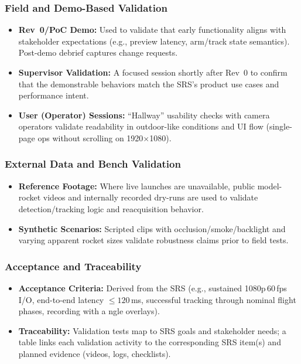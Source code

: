 \documentclass[12pt, titlepage]{article}
\begin{document}
\subsubsection*{Field and Demo-Based Validation}
\begin{itemize}
  \item \textbf{Rev~0/PoC Demo:} Used to validate that early
        functionality aligns with stakeholder expectations (e.g., preview
        latency, arm/track state semantics). Post-demo debrief captures change
        requests.
  \item \textbf{Supervisor Validation:} A focused session shortly
        after Rev~0 to confirm that the demonstrable behaviors match the
        SRS’s product use cases and performance intent.
  \item \textbf{User (Operator) Sessions:} ``Hallway'' usability
        checks with camera operators validate readability in outdoor-like
        conditions and UI flow (single-page ops without scrolling on 1920$\times$1080).
\end{itemize}

\subsubsection*{External Data and Bench Validation}
\begin{itemize}
  \item \textbf{Reference Footage:} Where live launches are unavailable,
        public model-rocket videos and internally recorded dry-runs are used
        to validate detection/tracking logic and reacquisition behavior.
  \item \textbf{Synthetic Scenarios:} Scripted clips with
        occlusion/smoke/backlight and varying apparent rocket sizes validate
        robustness claims prior to field tests.
\end{itemize}

\subsubsection*{Acceptance and Traceability}
\begin{itemize}
  \item \textbf{Acceptance Criteria:} Derived from the SRS (e.g.,
        sustained 1080p\,60\,fps I/O, end-to-end latency $\leq 120$\,ms,
        successful tracking through nominal flight phases, recording with a
        ngle overlays).
  \item \textbf{Traceability:} Validation tests map to SRS goals and
        stakeholder needs; a table links each validation activity to the
        corresponding SRS item(s) and planned evidence (videos, logs, checklists).
\end{itemize}
\end{document}
